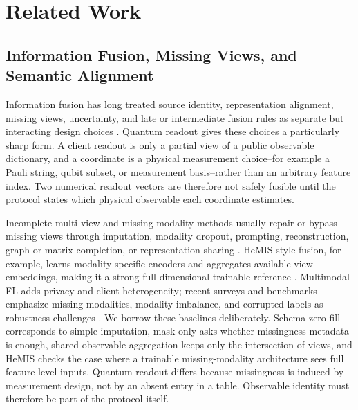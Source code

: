 \documentclass[preprint]{elsarticle}
\begin{document}
\section{Related Work}

\subsection{Information Fusion, Missing Views, and Semantic Alignment}

Information fusion has long treated source identity, representation alignment, missing views, uncertainty, and late or intermediate fusion rules as separate but interacting design choices \cite{castanedo2013datafusion,lahat2015multimodal,baltrusaitis2019multimodal,zhao2017multiview}. Quantum readout gives these choices a particularly sharp form. A client readout is only a partial view of a public observable dictionary, and a coordinate is a physical measurement choice--for example a Pauli string, qubit subset, or measurement basis--rather than an arbitrary feature index. Two numerical readout vectors are therefore not safely fusible until the protocol states which physical observable each coordinate estimates.

Incomplete multi-view and missing-modality methods usually repair or bypass missing views through imputation, modality dropout, prompting, reconstruction, graph or matrix completion, or representation sharing \cite{havaei2016hemis,tang2024incomplete,cai2024projected,wu2024missingmodality}. HeMIS-style fusion, for example, learns modality-specific encoders and aggregates available-view embeddings, making it a strong full-dimensional trainable reference \cite{havaei2016hemis}. Multimodal FL adds privacy and client heterogeneity; recent surveys and benchmarks emphasize missing modalities, modality imbalance, and corrupted labels as robustness challenges \cite{lin2023federatedmultimodal,che2023multimodalsurvey,feng2023fedmultimodal,yu2024fedinmm}. We borrow these baselines deliberately. Schema zero-fill corresponds to simple imputation, mask-only asks whether missingness metadata is enough, shared-observable aggregation keeps only the intersection of views, and HeMIS checks the case where a trainable missing-modality architecture sees full feature-level inputs. Quantum readout differs because missingness is induced by measurement design, not by an absent entry in a table. Observable identity must therefore be part of the protocol itself.
\end{document}
